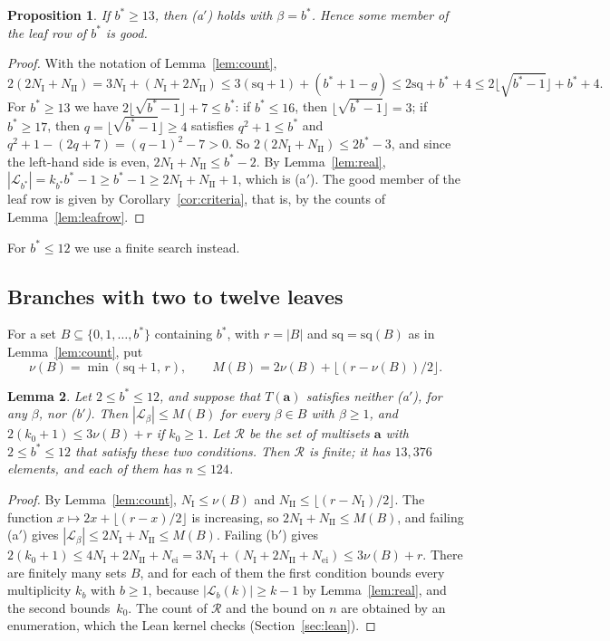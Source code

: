\documentclass[11pt]{article}
\numberwithin{equation}{section}
\newtheorem{lemma}{Lemma}[section]
\newtheorem{proposition}[lemma]{Proposition}
\theoremstyle{remark}
\newcommand{\cL}{\mathcal L}
\newcommand{\cR}{\mathcal R}
\newcommand{\bfa}{\mathbf a}
\newcommand{\NI}{N_{\mathrm I}}
\newcommand{\NII}{N_{\mathrm{II}}}
\newcommand{\Nei}{N_{\mathrm{ei}}}
\newcommand{\sq}{\mathrm{sq}}
\begin{document}
\begin{proposition}\label{prop:large}
If $b^*\ge13$, then (a$'$) holds with $\beta=b^*$. Hence some member of the
leaf row of $b^*$ is good.
\end{proposition}
\begin{proof}
With the notation of Lemma~\ref{lem:count},
\[
 2(2\NI+\NII)=3\NI+(\NI+2\NII)\le3(\sq+1)+(b^*+1-g)\le2\sq+b^*+4
 \le2\lfloor\sqrt{b^*-1}\rfloor+b^*+4 .
\]
For $b^*\ge13$ we have $2\lfloor\sqrt{b^*-1}\rfloor+7\le b^*$: if $b^*\le16$,
then $\lfloor\sqrt{b^*-1}\rfloor=3$; if $b^*\ge17$, then
$q=\lfloor\sqrt{b^*-1}\rfloor\ge4$ satisfies $q^2+1\le b^*$ and
$q^2+1-(2q+7)=(q-1)^2-7>0$. So $2(2\NI+\NII)\le2b^*-3$, and since the
left-hand side is even, $2\NI+\NII\le b^*-2$. By Lemma~\ref{lem:real},
$|\cL_{b^*}|=k_{b^*}b^*-1\ge b^*-1\ge2\NI+\NII+1$, which is (a$'$). The good
member of the leaf row is given by Corollary~\ref{cor:criteria}, that is, by
the counts of Lemma~\ref{lem:leafrow}.
\end{proof}

For $b^*\le12$ we use a finite search instead.

\subsection{Branches with two to twelve leaves}

For a set $B\subseteq\{0,1,\dots,b^*\}$ containing $b^*$, with $r=|B|$ and
$\sq=\sq(B)$ as in Lemma~\ref{lem:count}, put
\[
 \nu(B)=\min(\sq+1,\,r),\qquad
 M(B)=2\nu(B)+\bigl\lfloor(r-\nu(B))/2\bigr\rfloor .
\]

\begin{lemma}\label{lem:region}
Let $2\le b^*\le12$, and suppose that $T(\bfa)$ satisfies neither (a$'$), for
any $\beta$, nor (b$'$). Then $|\cL_\beta|\le M(B)$ for every $\beta\in B$ with
$\beta\ge1$, and $2(k_0+1)\le3\nu(B)+r$ if $k_0\ge1$. Let $\cR$ be the set of
multisets $\bfa$ with $2\le b^*\le12$ that satisfy these two conditions. Then
$\cR$ is finite; it has $13{,}376$ elements, and each of them has $n\le124$.
\end{lemma}
\begin{proof}
By Lemma~\ref{lem:count}, $\NI\le\nu(B)$ and $\NII\le\lfloor(r-\NI)/2\rfloor$.
The function $x\mapsto2x+\lfloor(r-x)/2\rfloor$ is increasing, so
$2\NI+\NII\le M(B)$, and failing (a$'$) gives $|\cL_\beta|\le2\NI+\NII\le M(B)$.
Failing (b$'$) gives $2(k_0+1)\le4\NI+2\NII+\Nei=3\NI+(\NI+2\NII+\Nei)\le
3\nu(B)+r$. There are finitely many sets $B$, and for each of them the first
condition bounds every multiplicity $k_b$ with $b\ge1$, because
$|\cL_b(k)|\ge k-1$ by Lemma~\ref{lem:real}, and the second bounds~$k_0$.
The count of $\cR$ and the bound on $n$ are obtained by an enumeration, which
the Lean kernel checks (Section~\ref{sec:lean}).
\end{proof}
\end{document}
